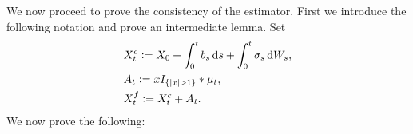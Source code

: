 \begin{comment} \subsection{Finite activity \levy jumps}
In order to demonstrate that the global estimator of spot volatility is consistent, we will proceed in stages.  First suppose the price process specified in all generality in \eqref{eq:generalsemimartingale} experiences at most a finite number of \levy jumps in any finite time interval. That is we assume that $X$ has finite activity  \levy jumps, which is equivalent to $\nu$ being finite on the complement of   $\{0\}$. The finite activity assumption  also implies that the price process may be expressed as  
\end{comment}
We now proceed to prove the consistency of the estimator. First we introduce the following notation and prove an intermediate lemma. Set 
\begin{align}
  &X_t^c :=  X_0 + \int_0^t b_s \D s + \int_0^t \sigma_s \D W_s, \notag\\ 
  &A_t :=  xI_{\{\vert x \vert > 1 \}} \ast \mu_t, \notag \\
  &X^f_t := X^c_t + A_t.
  \label{jumpfa}
\end{align}
We now prove the following:
\begin{comment}
for $t \in \domain$ where the $Y_i$'s are  \iid jump sizes; $N$ is a Poisson process with intensity $\lambda$, independent of each $Y_i$. Under this conditions, we have the following:
\end{comment}
